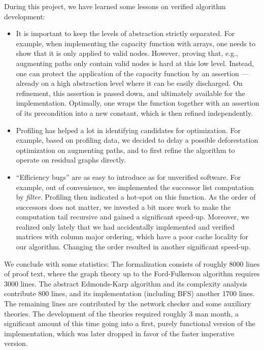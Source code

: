 \documentclass[smallcondensed]{svjour3}     %
\begin{document}
  During this project, we have learned some lessons on verified algorithm development: 
  \begin{itemize}
  \item It is important to keep the levels of abstraction strictly separated.
    For example, when implementing the capacity function with arrays, one needs to show that it is only applied to valid nodes.
    However, proving that, e.g., augmenting paths only contain valid nodes is hard at this low level. 
    Instead, one can protect the application of the capacity function by an assertion --- already on a high abstraction level where it can be easily discharged. 
    On refinement, this assertion is passed down, and ultimately available for the implementation.
    Optimally, one wraps the function together with an assertion of its precondition into a new constant, which is then refined independently.
  \item Profiling has helped a lot in identifying candidates for optimization. For example, based on profiling data, we decided to delay a 
    possible deforestation optimization on augmenting paths, and to first refine the algorithm to operate on residual graphs directly.
  \item ``Efficiency bugs'' are as easy to introduce as for unverified software. For example, out of convenience, we implemented the successor list computation by
    \emph{filter}. Profiling then indicated a hot-spot on this function. As the order of successors does not matter, we invested a bit more work to make the computation tail 
    recursive and gained a significant speed-up. Moreover, we realized only lately that we had accidentally implemented and verified
    matrices with column major ordering, which have a poor cache locality for our algorithm. Changing the order resulted in another significant speed-up.
  \end{itemize}
  
  We conclude with some statistics:
  The formalization consists of roughly 8000 lines of proof text, where the graph theory up to the Ford-Fulkerson algorithm requires 3000 lines.
  The abstract Edmonds-Karp algorithm and its complexity analysis contribute 800 lines, and its implementation (including BFS) another 1700 lines.
  The remaining lines are contributed by the network checker and some auxiliary theories. The development of the theories required roughly 3 man month, a significant amount of this time going into a first, purely functional version of the implementation, which was later dropped in favor of the faster imperative version.
  
\end{document}
